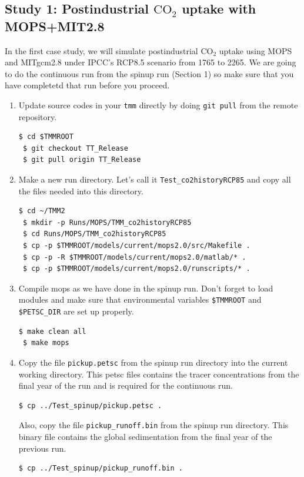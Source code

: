 \documentclass[a4paper]{article}
\def\noin{\noindent }
\begin{document}
\subsection{Study 1: Postindustrial $\mathrm{CO_{2}}$ uptake with MOPS+MIT2.8}
\noin In the first case study, we will simulate postindustrial $\mathrm{CO_{2}}$ uptake using MOPS and MITgcm2.8 under IPCC's RCP8.5 scenario from 1765 to 2265. We are going to do the continuous run from the spinup run (Section 1) so make sure that you have completetd that run before you proceed.
\begin{enumerate}

\item Update source codes in your \verb|tmm| directly by doing \verb|git pull| from the remote repository.
\begin{lstlisting}[style=DOS]
 $ cd $TMMROOT
 $ git checkout TT_Release
 $ git pull origin TT_Release
\end{lstlisting}

\item Make a new run directory. Let's call it \verb|Test_co2historyRCP85| and copy all the files needed into this directory.
\begin{lstlisting}[style=DOS]
 $ cd ~/TMM2
 $ mkdir -p Runs/MOPS/TMM_co2historyRCP85
 $ cd Runs/MOPS/TMM_co2historyRCP85
 $ cp -p $TMMROOT/models/current/mops2.0/src/Makefile .
 $ cp -p -R $TMMROOT/models/current/mops2.0/matlab/* .
 $ cp -p $TMMROOT/models/current/mops2.0/runscripts/* .
\end{lstlisting}

\item Compile mops as we have done in the spinup run. Don't forget to load modules and make sure that environmental variables \verb|$TMMROOT| and \verb|$PETSC_DIR| are set up properly.
\begin{lstlisting}[style=DOS]
 $ make clean all
 $ make mops
\end{lstlisting}

\item Copy the file \verb|pickup.petsc| from the spinup run directory into the current working directory. This petsc files contains the tracer concentrations from the final year of the run and is required for the continuous run.
\begin{lstlisting}[style=DOS]
 $ cp ../Test_spinup/pickup.petsc .
\end{lstlisting}

\noin Also, copy the file \verb|pickup_runoff.bin| from the spinup run directory. This binary file contains the global sedimentation from the final year of the previous run.
\begin{lstlisting}[style=DOS]
 $ cp ../Test_spinup/pickup_runoff.bin .
\end{lstlisting}


\end{enumerate}
\end{document}
